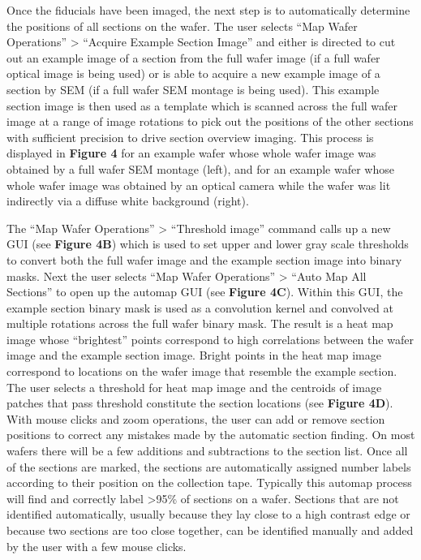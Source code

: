 \documentclass{article}
\begin{document}
Once the fiducials have been imaged, the next step is to automatically determine the positions of all sections on the wafer. The user selects “Map Wafer Operations” > “Acquire Example Section Image” and either is directed to cut out an example image of a section from the full wafer image (if a full wafer optical image is being used) or is able to acquire a new example image of a section by SEM (if a full wafer SEM montage is being used). This example section image is then used as a template which is scanned across the full wafer image at a range of image rotations to pick out the positions of the other sections with sufficient precision to drive section overview imaging. This process is displayed in \textbf{Figure 4} for an example wafer whose whole wafer image was obtained by a full wafer SEM montage (left), and for an example wafer whose whole wafer image was obtained by an optical camera while the wafer was lit indirectly via a diffuse white background (right).

The “Map Wafer Operations” > “Threshold image” command calls up a new GUI (see \textbf{Figure 4B}) which is used to set upper and lower gray scale thresholds to convert both the full wafer image and the example section image into binary masks. Next the user selects “Map Wafer Operations” > “Auto Map All Sections” to open up the automap GUI (see \textbf{Figure 4C}). Within this GUI, the example section binary mask is used as a convolution kernel and convolved at multiple rotations across the full wafer binary mask. The result is a heat map image whose “brightest” points correspond to high correlations between the wafer image and the example section image. Bright points in the heat map image correspond to locations on the wafer image that resemble the example section. The user selects a threshold for heat map image and the centroids of image patches that pass threshold constitute the section locations (see \textbf{Figure 4D}). With mouse clicks and zoom operations, the user can add or remove section positions to correct any mistakes made by the automatic section finding. On most wafers there will be a few additions and subtractions to the section list. Once all of the sections are marked, the sections are automatically assigned number labels according to their position on the collection tape. Typically this automap process will find and correctly label >95\% of sections on a wafer. Sections that are not identified automatically, usually because they lay close to a high contrast edge or because two sections are too close together, can be identified manually and added by the user with a few mouse clicks.
\end{document}
